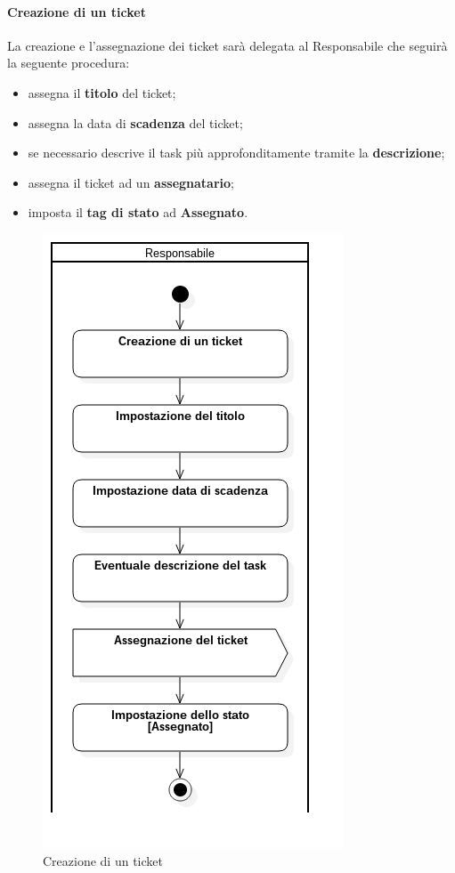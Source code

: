 	\paragraph{Creazione di un ticket}
	La creazione e l'assegnazione dei ticket sarà delegata al Responsabile che seguirà la seguente procedura:
	\begin{itemize}
		\item assegna il \textbf{titolo} del ticket;
		\item assegna la data di \textbf{scadenza} del ticket;
		\item se necessario descrive il task più approfonditamente tramite la \textbf{descrizione};
		\item assegna il ticket ad un \textbf{assegnatario};
		\item imposta il \textbf{tag di stato} ad \textbf{Assegnato}.
	\end{itemize}
	\begin{figure}
		\centering
		\includegraphics[scale=0.80]{img/creazioneTicket.png}
		\caption{Creazione di un ticket}
	\end{figure}
